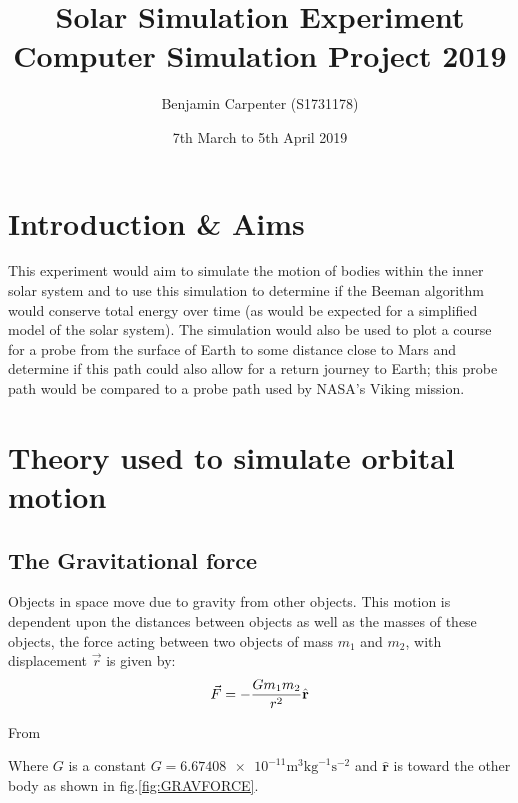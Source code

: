 \documentclass{article}
\title{Solar Simulation Experiment\\Computer Simulation Project 2019}
\author{Benjamin Carpenter (S1731178)}
\date{7th March to 5th April 2019}
\begin{document}
    \maketitle
    \addtocounter{page}{-1}
    \thispagestyle{empty}
    \pagebreak
    \pagestyle{empty} %
    \tableofcontents %
    \cleardoublepage %
    \pagestyle{plain} %
    \setcounter{page}{1} %

    \section{Introduction \& Aims}
        This experiment would aim to simulate the motion of bodies within the inner solar system and to use this simulation to determine 
        if the Beeman algorithm would conserve total energy over time (as would be expected for a 
        simplified model of the solar system). The simulation would also be used to plot a course 
        for a probe from the surface of Earth to some distance close to Mars and determine if this 
        path could also allow for a return journey to Earth; this probe path would be compared to a
        probe path used by NASA's Viking mission\cite{VIKINGPROGRAMNASA}.
    
    \section{Theory used to simulate orbital motion}
        \subsection{The Gravitational force}
        Objects in space move due to gravity from other objects. This motion is dependent upon the 
        distances between objects as well as the masses of these objects, the force acting between 
        two objects of mass $m_1$ and $m_2$, with displacement $\vec{r}$ is given by:
        \begin{equation}
            \centering
            \vec{F} =-\frac{Gm_1m_2}{r^2}\hat{\textbf{r}}
            \label{eqn:GravitationalForce}
        \end{equation}
        \begin{flushright}
            From \cite[s. 3.12]{PHYS1ANOTES}
        \end{flushright}
        
        Where $G$ is a constant 
        $G = \num{6.67408e-11} \si{\metre}^3\si{\kilo\gram}^{-1}\si{\second}^{-2}$   
        \cite{GRAVCONST}   
        and  $\hat{\textbf{r}}$ is toward the other body as shown in fig.\ref{fig:GRAVFORCE}.
        
\end{document}
